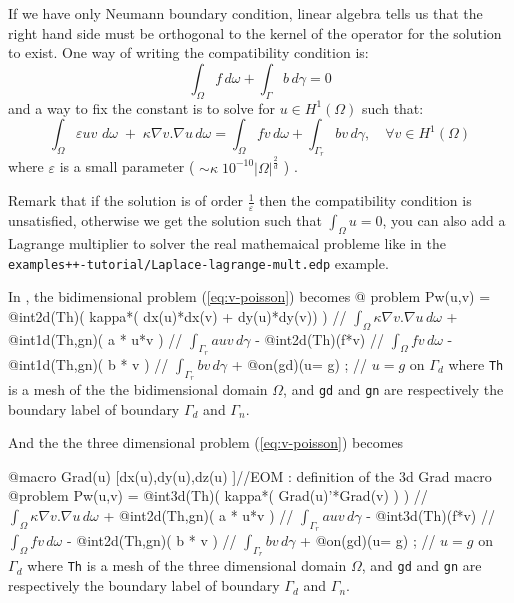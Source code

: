 \documentclass[a4paper,twoside,12pt]{book}
\begin{document}
\begin{note}
\label{note:fu}
\rm
If we have only Neumann boundary condition, 
linear algebra tells us that the right hand side must be orthogonal to the kernel of
the operator for the solution to exist.  One way of writing the compatibility condition is: 
$$
 \int_{\Omega} f   \,d\omega  + \int_{\Gamma} b \,d\gamma=0
$$
and a way to fix the constant is to solve for $u \in H^1(\Omega)$ such that:
\begin{equation}
 {\int_{\Omega} \varepsilon u v \,\,d\omega\; + \; \kappa \nabla{ v} . \nabla u  \,d\omega
  = \int_{\Omega} f {v}}  \,d\omega  + \int_{\Gamma_r} b v  \,d\gamma , \quad \forall v \in H^1(\Omega) \label{eq:v-poisson-N}
\end{equation}
where $\varepsilon$ is a small parameter ( $ \sim \kappa\; 10^{-10} |\Omega|^{\frac2d} $ ) .

Remark that if the solution
is of order $ \frac{1}{\varepsilon}$ then the compatibility condition is unsatisfied, otherwise
we get the solution such that $\int_\Omega u = 0 $, you can also add a Lagrange multiplier to solver
the real mathemaical probleme like in the \verb!examples++-tutorial/Laplace-lagrange-mult.edp!
example.
\end{note}

In \freefempp,  the bidimensional problem (\ref{eq:v-poisson}) becomes
\bFF
 @ problem Pw(u,v) =
       @int2d(Th)( kappa*( dx(u)*dx(v) +  dy(u)*dy(v)) )  // $\int_{\Omega} \kappa \nabla{v} . \nabla u  \,d\omega$ \hfilll
     + @int1d(Th,gn)( a * u*v )                        // $\int_{\Gamma_r} a u v  \,d\gamma$  \hfilll
     - @int2d(Th)(f*v)                                 // $\int_{\Omega} f v  \,d\omega $ \hfilll
     - @int1d(Th,gn)( b * v )                          // $ \int_{\Gamma_r} b v  \,d\gamma$ \hfilll
     + @on(gd)(u= g) ;                                 // $ u =g $ on $\Gamma_d$  \hfilll
\eFF
where \texttt{Th} is a mesh of the the bidimensional  domain $\Omega$, and \texttt{gd} and \texttt{gn} are respectively the
boundary label of boundary $\Gamma_d$ and $\Gamma_n$.

And the the three dimensional problem (\ref{eq:v-poisson}) becomes

\bFF
  @macro Grad(u) [dx(u),dy(u),dz(u) ]//EOM :  definition of the 3d Grad macro
  @problem Pw(u,v) =
       @int3d(Th)( kappa*( Grad(u)'*Grad(v) ) )  // $\int_{\Omega} \kappa \nabla{v} . \nabla u  \,d\omega$ \hfilll
     + @int2d(Th,gn)( a * u*v )                        // $\int_{\Gamma_r} a u v  \,d\gamma$  \hfilll
     - @int3d(Th)(f*v)                                 // $\int_{\Omega} f v  \,d\omega $ \hfilll
     - @int2d(Th,gn)( b * v )                          // $ \int_{\Gamma_r} b v  \,d\gamma$ \hfilll
     + @on(gd)(u= g) ;                                 // $ u =g $ on $\Gamma_d$  \hfilll
\eFF
where \texttt{Th} is a mesh of the three dimensional  domain $\Omega$, and \texttt{gd} and \texttt{gn} are respectively the
boundary label of boundary $\Gamma_d$ and $\Gamma_n$.
\end{document}
